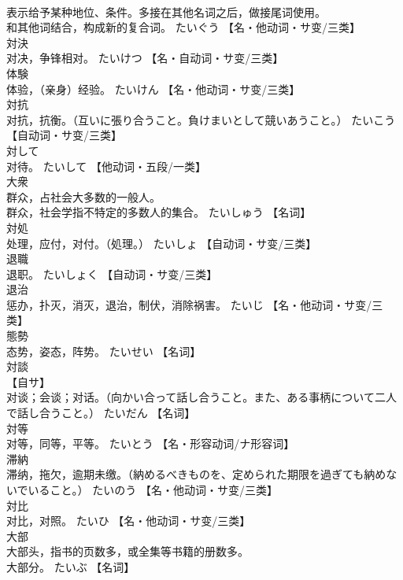 \documentclass[8pt]{extreport}
\begin{document}
\begin{CJK}{UTF8}{min}
\\	表示给予某种地位、条件。多接在其他名词之后，做接尾词使用。 
\\	和其他词结合，构成新的复合词。	たいぐう		【名・他动词・サ变/三类】
\\	対決	
\\	对决，争锋相对。	たいけつ		【名・自动词・サ变/三类】
\\	体験	
\\	体验，（亲身）经验。	たいけん		【名・他动词・サ变/三类】
\\	対抗	
\\	对抗，抗衡。（互いに張り合うこと。負けまいとして競いあうこと。）	たいこう		【自动词・サ变/三类】
\\	対して	
\\	对待。	たいして		【他动词・五段/一类】
\\	大衆	
\\	群众，占社会大多数的一般人。 
\\	群众，社会学指不特定的多数人的集合。	たいしゅう		【名词】
\\	対処	
\\	处理，应付，对付。（処理。）	たいしょ		【自动词・サ变/三类】
\\	退職	
\\	退职。	たいしょく		【自动词・サ变/三类】
\\	退治	
\\	惩办，扑灭，消灭，退治，制伏，消除祸害。	たいじ		【名・他动词・サ变/三类】
\\	態勢	
\\	态势，姿态，阵势。	たいせい		【名词】
\\	対談	
\\	【自サ】 
\\	对谈；会谈；对话。（向かい合って話し合うこと。また、ある事柄について二人で話し合うこと。）	たいだん		【名词】
\\	対等	
\\	对等，同等，平等。	たいとう		【名・形容动词/ナ形容词】
\\	滞納	
\\	滞纳，拖欠，逾期未缴。（納めるべきものを、定められた期限を過ぎても納めないでいること。）	たいのう		【名・他动词・サ变/三类】
\\	対比	
\\	对比，对照。	たいひ		【名・他动词・サ变/三类】
\\	大部	
\\	大部头，指书的页数多，或全集等书籍的册数多。 
\\	大部分。	たいぶ		【名词】

\end{CJK}
\end{document}
